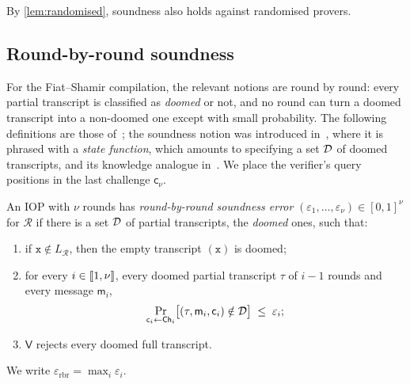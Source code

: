 By \cref{lem:randomised}, soundness also holds against randomised provers.

\subsection{Round-by-round soundness}\label{sec:proofs:rbr}

For the Fiat--Shamir compilation, the relevant notions are round by round: every partial transcript is classified as \emph{doomed} or not, and no round can turn a doomed transcript into a non-doomed one except with small probability.
The following definitions are those of~\cite[Definitions~3.11 and~3.12]{BGTZ24}; the soundness notion was introduced in~\cite{CCHLRRW19}, where it is phrased with a \emph{state function}, which amounts to specifying a set $\mathcal{D}$ of doomed transcripts, and its knowledge analogue in~\cite{CMS19}.
We place the verifier's query positions in the last challenge $\mathsf{c}_\nu$.

\begin{definition}\label{def:rbr}
An IOP with $\nu$ rounds has \emph{round-by-round soundness error} $(\varepsilon_1,\dots,\varepsilon_\nu) \in [0,1]^\nu$ for $\mathcal{R}$ if there is a set $\mathcal{D}$ of partial transcripts, the \emph{doomed} ones, such that:
\begin{enumerate}
  \item if $\mathtt{x} \notin L_{\mathcal{R}}$, then the empty transcript $(\mathtt{x})$ is doomed;
  \item for every $i \in \llbracket 1, \nu \rrbracket$, every doomed partial transcript $\tau$ of $i-1$ rounds and every message $\mathsf{m}_i$,
  \[
    \Pr_{\mathsf{c}_i \leftarrow \mathsf{Ch}_i}\bigl[(\tau, \mathsf{m}_i, \mathsf{c}_i) \notin \mathcal{D}\bigr] \;\le\; \varepsilon_i ;
  \]
  \item $\mathsf{V}$ rejects every doomed full transcript.
\end{enumerate}
We write $\varepsilon_{\mathrm{rbr}} = \max_i \varepsilon_i$.
\end{definition}

